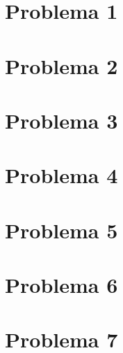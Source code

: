\documentclass{homework}
\begin{document}
	
	\listofproblem
	\newpage

	\section{Problema 1}
\color{blue}

\color{black}
	



	\section{Problema 2}
\color{blue}

\color{black}
	



	\section{Problema 3}
\color{blue}

\color{black}
	



	\section{Problema 4}
\color{blue}

\color{black}
	



	\section{Problema 5}
\color{blue}

\color{black}
	



	\section{Problema 6}
\color{blue}

\color{black}
	



	\section{Problema 7}
\color{blue}
\end{document}
